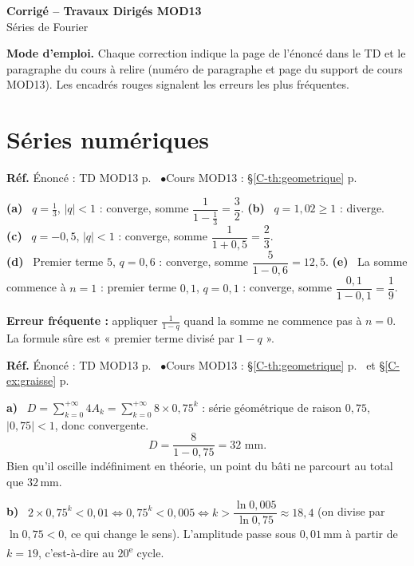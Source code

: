 \documentclass[a4paper,11pt]{article}
\newcommand{\cours}[1]{§\ref{C-#1} p.~\pageref{C-#1}}
\newcommand{\source}[2]{{\footnotesize\color{uimmgray}\textbf{Réf.} \enspace Énoncé : TD MOD13 p.~\pageref{T-#1} \enspace$\bullet$\enspace Cours MOD13 : #2}\par\smallskip}
\newcommand{\q}[1]{\textbf{\color{uimmblue}#1}\ }
\begin{document}
\begin{tcolorbox}[colback=uimmblue, colframe=uimmblue, sharp corners, boxrule=0pt,
  left=14pt, right=14pt, top=10pt, bottom=10pt]
{\color{white}\LARGE\bfseries Corrigé -- Travaux Dirigés MOD13}\\[4pt]
{\color{white}\large Séries de Fourier}
\end{tcolorbox}

\begin{tcolorbox}[colback=uimmlightgray, colframe=uimmgray, boxrule=0.8pt, arc=3pt]
\small\textbf{Mode d'emploi.} Chaque correction indique la page de l'énoncé dans le TD et le paragraphe du cours à relire (numéro de paragraphe et page du support de cours MOD13). Les encadrés rouges signalent les erreurs les plus fréquentes.
\end{tcolorbox}

\needspace{8cm}
\section{Séries numériques}

\begin{correction}
\source{exo:1}{\cours{th:geometrique}}
\q{(a)} $q = \frac13$, $|q|<1$ : converge, somme $\dfrac{1}{1-\frac13} = \dfrac32$.
\q{(b)} $q = 1{,}02\geq 1$ : diverge.
\q{(c)} $q = -0{,}5$, $|q|<1$ : converge, somme $\dfrac{1}{1+0{,}5} = \dfrac23$.\\
\q{(d)} Premier terme $5$, $q = 0{,}6$ : converge, somme $\dfrac{5}{1-0{,}6} = 12{,}5$.
\q{(e)} La somme commence à $n = 1$ : premier terme $0{,}1$, $q = 0{,}1$ : converge, somme $\dfrac{0{,}1}{1-0{,}1} = \dfrac19$.
\begin{piege}
\textbf{Erreur fréquente :} appliquer $\frac{1}{1-q}$ quand la somme ne commence pas à $n = 0$. La formule sûre est « premier terme divisé par $1-q$ ».
\end{piege}
\end{correction}

\begin{correction}
\source{exo:2}{\cours{th:geometrique} et \cours{ex:graisse}}
\q{a)} $D = \displaystyle\sum_{k=0}^{+\infty}4A_k = \sum_{k=0}^{+\infty}8\times 0{,}75^{k}$ : série géométrique de raison $0{,}75$, $|0{,}75|<1$, donc convergente.
\[
D = \frac{8}{1-0{,}75} = 32 \text{ mm.}
\]
Bien qu'il oscille indéfiniment en théorie, un point du bâti ne parcourt au total que $32$\,mm.

\q{b)} $2\times 0{,}75^{k} < 0{,}01 \iff 0{,}75^{k} < 0{,}005 \iff k > \dfrac{\ln 0{,}005}{\ln 0{,}75}\approx 18{,}4$ (on divise par $\ln 0{,}75 < 0$, ce qui change le sens). L'amplitude passe sous $0{,}01$\,mm à partir de $k = 19$, c'est-à-dire au $20$\textsuperscript{e} cycle.
\end{correction}
\end{document}
